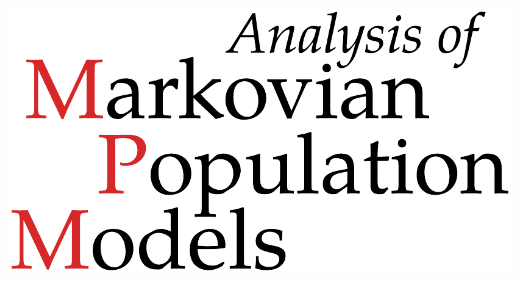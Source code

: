 \thispagestyle{empty}
\begin{changemargin}{0mm}{-2cm}
\begin{center}
	\bigskip
	\bigskip
	\bigskip
	\bigskip
	\includegraphics[scale=0.7]{gfx/titlepage.pdf}\\
	\bigskip
	\textsc{\myName}
\end{center}

\end{changemargin}
